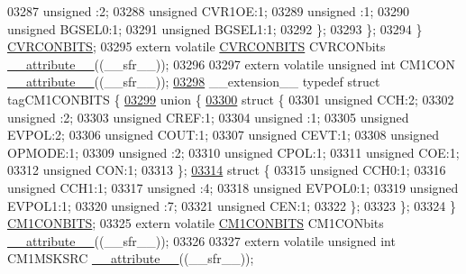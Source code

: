 \begin{DoxyCode}
03287       \textcolor{keywordtype}{unsigned} :2;
03288       \textcolor{keywordtype}{unsigned} CVR1OE:1;
03289       \textcolor{keywordtype}{unsigned} :1;
03290       \textcolor{keywordtype}{unsigned} BGSEL0:1;
03291       \textcolor{keywordtype}{unsigned} BGSEL1:1;
03292     \};
03293   \};
03294 \} \hyperlink{a00014_db/d7e/a00372}{CVRCONBITS};
03295 \textcolor{keyword}{extern} \textcolor{keyword}{volatile} \hyperlink{a00014_db/d7e/a00372}{CVRCONBITS} CVRCONbits \hyperlink{a00015_a493c46f03454991ccc5aa7a6e1dfb2a7}{\_\_attribute\_\_}((\_\_sfr\_\_));
03296 
03297 \textcolor{keyword}{extern} \textcolor{keyword}{volatile} \textcolor{keywordtype}{unsigned} \textcolor{keywordtype}{int}  CM1CON \hyperlink{a00015_a493c46f03454991ccc5aa7a6e1dfb2a7}{\_\_attribute\_\_}((\_\_sfr\_\_));
\hypertarget{a00015_source_l03298}{}\hyperlink{a00014}{03298} \_\_extension\_\_ \textcolor{keyword}{typedef} \textcolor{keyword}{struct }tagCM1CONBITS \{
\hypertarget{a00015_source_l03299}{}\hyperlink{a00015}{03299}   \textcolor{keyword}{union }\{
\hypertarget{a00015_source_l03300}{}\hyperlink{a00015}{03300}     \textcolor{keyword}{struct }\{
03301       \textcolor{keywordtype}{unsigned} CCH:2;
03302       \textcolor{keywordtype}{unsigned} :2;
03303       \textcolor{keywordtype}{unsigned} CREF:1;
03304       \textcolor{keywordtype}{unsigned} :1;
03305       \textcolor{keywordtype}{unsigned} EVPOL:2;
03306       \textcolor{keywordtype}{unsigned} COUT:1;
03307       \textcolor{keywordtype}{unsigned} CEVT:1;
03308       \textcolor{keywordtype}{unsigned} OPMODE:1;
03309       \textcolor{keywordtype}{unsigned} :2;
03310       \textcolor{keywordtype}{unsigned} CPOL:1;
03311       \textcolor{keywordtype}{unsigned} COE:1;
03312       \textcolor{keywordtype}{unsigned} CON:1;
03313     \};
\hypertarget{a00015_source_l03314}{}\hyperlink{a00015}{03314}     \textcolor{keyword}{struct }\{
03315       \textcolor{keywordtype}{unsigned} CCH0:1;
03316       \textcolor{keywordtype}{unsigned} CCH1:1;
03317       \textcolor{keywordtype}{unsigned} :4;
03318       \textcolor{keywordtype}{unsigned} EVPOL0:1;
03319       \textcolor{keywordtype}{unsigned} EVPOL1:1;
03320       \textcolor{keywordtype}{unsigned} :7;
03321       \textcolor{keywordtype}{unsigned} CEN:1;
03322     \};
03323   \};
03324 \} \hyperlink{a00014_d3/d07/a00305}{CM1CONBITS};
03325 \textcolor{keyword}{extern} \textcolor{keyword}{volatile} \hyperlink{a00014_d3/d07/a00305}{CM1CONBITS} CM1CONbits \hyperlink{a00015_a493c46f03454991ccc5aa7a6e1dfb2a7}{\_\_attribute\_\_}((\_\_sfr\_\_));
03326 
03327 \textcolor{keyword}{extern} \textcolor{keyword}{volatile} \textcolor{keywordtype}{unsigned} \textcolor{keywordtype}{int}  CM1MSKSRC \hyperlink{a00015_a493c46f03454991ccc5aa7a6e1dfb2a7}{\_\_attribute\_\_}((\_\_sfr\_\_));

\end{DoxyCode}
